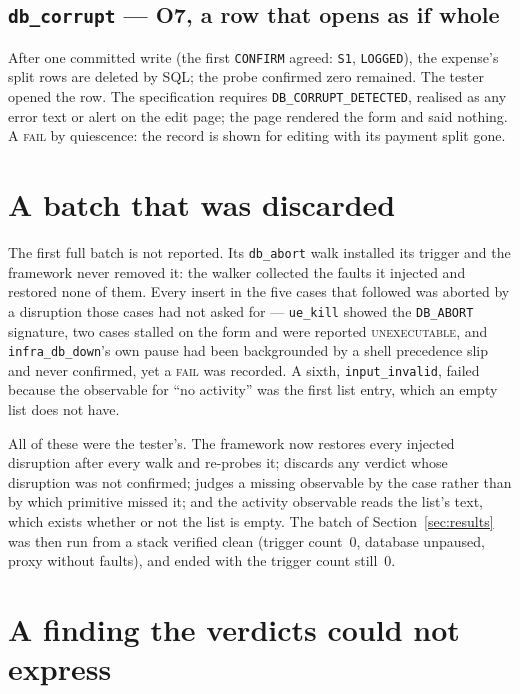 \documentclass[11pt,a4paper]{article}
\newcommand{\gate}[1]{\texttt{\small #1}}
\newcommand{\obl}[1]{\textbf{O#1}}
\begin{document}
\subsection{\gate{db\_corrupt} --- \obl{7}, a row that opens as if whole}

After one committed write (the first \gate{CONFIRM} agreed: \gate{S1},
\gate{LOGGED}), the expense's split rows are deleted by SQL; the probe confirmed
zero remained. The tester opened the row. The specification requires
\gate{DB\_CORRUPT\_DETECTED}, realised as any error text or alert on the edit
page; the page rendered the form and said nothing. A \textsc{fail} by
quiescence: the record is shown for editing with its payment split gone.

\section{A batch that was discarded}
\label{sec:batch}

The first full batch is not reported. Its \gate{db\_abort} walk installed its
trigger and the framework never removed it: the walker collected the faults it
injected and restored none of them. Every insert in the five cases that followed
was aborted by a disruption those cases had not asked for --- \gate{ue\_kill}
showed the \gate{DB\_ABORT} signature, two cases stalled on the form and were
reported \textsc{unexecutable}, and \gate{infra\_db\_down}'s own pause had been
backgrounded by a shell precedence slip and never confirmed, yet a \textsc{fail}
was recorded. A sixth, \gate{input\_invalid}, failed because the observable for
``no activity'' was the first list entry, which an empty list does not have.

All of these were the tester's. The framework now restores every injected
disruption after every walk and re-probes it; discards any verdict whose
disruption was not confirmed; judges a missing observable by the case rather than
by which primitive missed it; and the activity observable reads the list's text,
which exists whether or not the list is empty. The batch of
Section~\ref{sec:results} was then run from a stack verified clean (trigger
count~0, database unpaused, proxy without faults), and ended with the trigger
count still~0.

\section{A finding the verdicts could not express}
\label{sec:finding}
\end{document}
